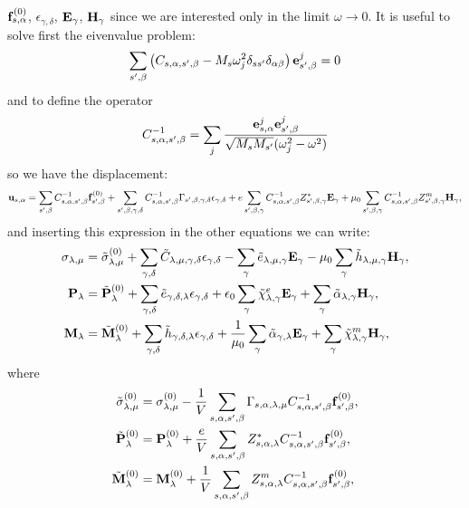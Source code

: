 \documentclass[12pt,a4paper]{article}
\begin{document}
${\bf f}^{(0)}_{s,\alpha}$, $\epsilon_{\gamma,\delta}$,
${\bf E}_{\gamma}$,
${\bf H}_{\gamma}$ since we are interested only in the limit 
$\omega \rightarrow 0$.
It is useful to solve first the eivenvalue problem:
\begin{equation}
\sum_{s',\beta} \left(C_{s,\alpha,s',\beta} - 
M_s \omega_j^2 \delta_{ss'}\delta_{\alpha\beta}\right){\bf e}^j_{s',\beta}=0
\end{equation}
and to define the operator
\begin{equation}
C^{-1}_{s,\alpha,s',\beta} = \sum_j {{\bf e}^j_{s,\alpha} {\bf e}^j_{s',\beta}
\over \sqrt{M_s M_{s'}}(\omega^2_j - \omega^2)}
\end{equation}
so we have the displacement:
\begin{equation}
{\bf u}_{s,\alpha}=\sum_{s',\beta} C^{-1}_{s,\alpha,s',\beta}
{\bf f}^{(0)}_{s',\beta} + \sum_{s',\beta,\gamma,\delta} 
C^{-1}_{s,\alpha,s',\beta}
\Gamma_{s',\beta,\gamma,\delta} \epsilon_{\gamma,\delta}
+ e \sum_{s',\beta,\gamma} C^{-1}_{s,\alpha,s',\beta}
Z^*_{s',\beta,\gamma} {\bf E}_{\gamma} 
+ \mu_0 \sum_{s',\beta,\gamma} C^{-1}_{s,\alpha,s',\beta} 
Z^m_{s',\beta,\gamma} 
{\bf H}_{\gamma},
\end{equation}
and inserting this expression in the other equations we can write:
\begin{align}
\sigma_{\lambda,\mu}&= \tilde \sigma_{\lambda,\mu}^{(0)}
+\sum_{\gamma,\delta} \tilde C_{\lambda,\mu,\gamma,\delta}  
\epsilon_{\gamma,\delta} -
\sum_{\gamma} \tilde e_{\lambda,\mu,\gamma} 
 {\bf E}_{\gamma}
-\mu_0 \sum_{\gamma}  \tilde h_{\lambda,\mu,\gamma} 
{\bf H}_{\gamma}, \\
{\bf P}_{\lambda}&= \tilde {\bf P}^{(0)}_{\lambda}
+\sum_{\gamma,\delta} \tilde e_{\gamma,\delta,\lambda} 
\epsilon_{\gamma,\delta} +
\epsilon_0 \sum_{\gamma} 
\tilde \chi^e_{\lambda,\gamma}
{\bf E}_{\gamma} +
\sum_{\gamma} \tilde \alpha_{\lambda,\gamma} 
{\bf H}_{\gamma}, \\
{\bf M}_{\lambda}&= \tilde {\bf M}^{(0)}_{\lambda}
+\sum_{\gamma,\delta}  \tilde h_{\gamma,\delta,\lambda} 
\epsilon_{\gamma,\delta} 
+{1\over \mu_0} \sum_{\gamma} \tilde \alpha_{\gamma,\lambda} {\bf E}_{\gamma}
+\sum_{\gamma} 
\tilde \chi^m_{\lambda,\gamma}
{\bf H}_{\gamma},
\end{align}
where 
\begin{align}
\tilde \sigma^{(0)}_{\lambda,\mu}&= \sigma^{(0)}_{\lambda,\mu}
-{1\over V} \sum_{s,\alpha,s',\beta} \Gamma_{s,\alpha,\lambda,\mu}
C^{-1}_{s,\alpha,s',\beta} {\bf f}^{(0)}_{s',\beta}, \\
\tilde {\bf P}^{(0)}_\lambda&= {\bf P}^{(0)}_\lambda +{e\over V}
\sum_{s,\alpha,s',\beta} Z^*_{s,\alpha,\lambda} C^{-1}_{s,\alpha,s',\beta}
{\bf f}^{(0)}_{s',\beta}, \\
\tilde {\bf M}^{(0)}_\lambda&= {\bf M}^{(0)}_\lambda +{1\over V}
\sum_{s,\alpha,s',\beta} Z^m_{s,\alpha,\lambda} C^{-1}_{s,\alpha,s',\beta}
{\bf f}^{(0)}_{s',\beta},
\end{align}
\end{document}

